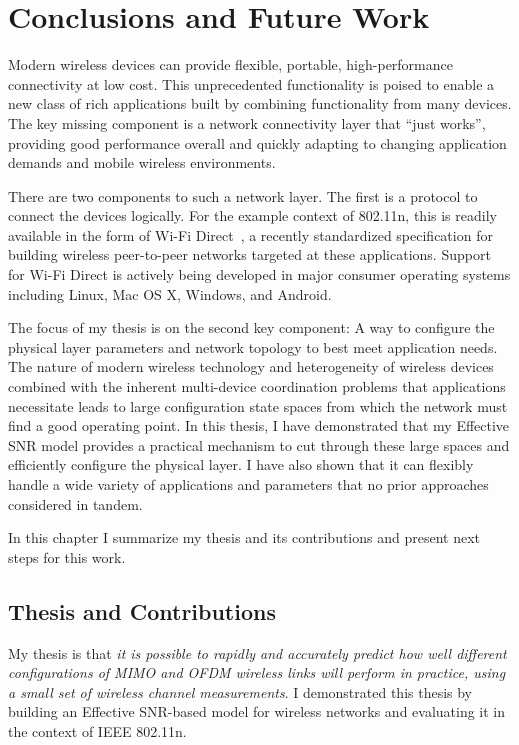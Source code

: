 \ifx\mainfile\undefined

\setcounter{chapter}{9} %
\fi

\cleardoublepage
\chapter{Conclusions and Future Work}
\label{chap:conclusion}

Modern wireless devices can provide flexible, portable, high-performance connectivity at low cost. This unprecedented functionality is poised to enable a new class of rich applications built by combining functionality from many devices. The key missing component is a network connectivity layer that ``just works'', providing good performance overall and quickly adapting to changing application demands and mobile wireless environments.

There are two components to such a network layer. The first is a protocol to connect the devices logically. For the example context of 802.11n, this is readily available in the form of Wi-Fi Direct~\cite{wifi_direct}, a recently standardized specification for building wireless peer-to-peer networks targeted at these applications. Support for Wi-Fi Direct is actively being developed in major consumer operating systems including Linux, Mac OS X, Windows, and Android.

The focus of my thesis is on the second key component: A way to configure the physical layer parameters and network topology to best meet application needs. The nature of modern wireless technology and heterogeneity of wireless devices combined with the inherent multi-device coordination problems that applications necessitate leads to large configuration state spaces from which the network must find a good operating point. In this thesis, I have demonstrated that my Effective SNR model provides a practical mechanism to cut through these large spaces and efficiently configure the physical layer. I have also shown that it can flexibly handle a wide variety of applications and parameters that no prior approaches considered in tandem.

In this chapter I summarize my thesis and its contributions and present next steps for this work.

\section{Thesis and Contributions}
My thesis is that \emph{it is possible to rapidly and accurately predict how well different configurations of MIMO and OFDM wireless links will perform in practice, using a small set of wireless channel measurements}. I demonstrated this thesis by building an Effective SNR-based model for wireless networks and evaluating it in the context of IEEE 802.11n.


